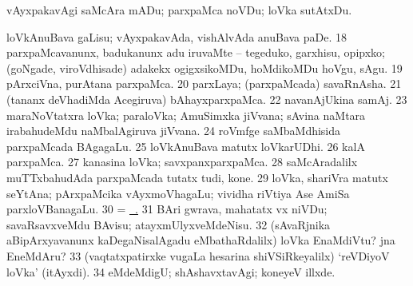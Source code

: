 {   vAyxpakavAgi saMcAra mADu;
 parxpaMca noVDu; loVka sutAtxDu. 

   loVkAnuBava gaLisu; vAyxpakavAda, vishAlvAda anuBava paDe. 
\num{18} 
 parxpaMcavanunx, badukanunx adu iruvaMte -- tegeduko, garxhisu,
 opipxko; (goNgade, viroVdhisade) adakekx ogigxsikoMDu, hoMdikoMDu
 hoVgu, sAgu. 
\num{19}  pArxciVna, purAtana
 parxpaMca. 
\num{20}  parxLaya;
 (parxpaMcada) savaRnAsha. 
\num{21}  (tananx
 deVhadiMda Acegiruva) bAhayxparxpaMca. 
\num{22}  navanAjUkina samAj. 
\hypertarget{world pagu23}{}
\num{23}  maraNoVtatxra loVka; paraloVka; AmuSimxka jiVvana; sAvina
 naMtara irabahudeMdu naMbalAgiruva jiVvana. 
\num{24}  roVmfge saMbaMdhisida parxpaMcada BAgagaLu. 
\num{25}
  loVkAnuBava matutx loVkarUDhi. 
\num{26}
  kalA parxpaMca.
\num{27}  kanasina loVka; savxpanxparxpaMca. 
\num{28}  saMcAradalilx muTTxbahudAda parxpaMcada tutatx tudi, kone.
\num{29}  loVka, shariVra
 matutx seYtAna; pArxpaMcika vAyxmoVhagaLu; vividha riVtiya Ase
 AmiSa parxloVBanagaLu. 
\num{30}  = \hyperlink{world pagu23}{\pagu\ .} 
\num{31}  BAri gwrava,
 mahatatx vx niVDu; savaRsavxveMdu BAvisu;
 atayxmUlyxveMdeNisu. 
\num{32} 
 (sAvaRjnika aBipArxyavanunx kaDegaNisalAgadu eMbathaRdalilx) loVka
 EnaMdiVtu? jna EneMdAru? 
\num{33} 
 (vaqtatxpatirxke \mo vugaLa hesarina shiVSiRkeyalilx) 
`reVDiyoV loVka' (itAyxdi). 
\num{34} 
 eMdeMdigU; shAshavxtavAgi; koneyeV illxde.}
\eentry

\bentry
{} 
\gl{\gu} 
\eentry

\bentry
{} 
\gl{\nA} 
\eentry

